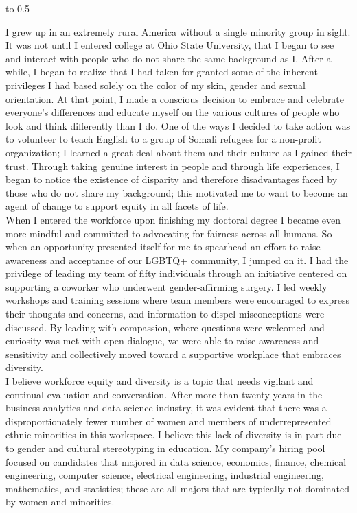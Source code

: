 

\noindent\hbox to 0.5\textwidth{}

I grew up in an extremely rural America without a single minority group in sight.  It was not until I entered college at Ohio State University, that I began to see and interact with people who do not share the same background as I.  After a while, I began to realize that I had taken for granted some of the inherent privileges I had based solely on the color of my skin, gender and sexual orientation.  At that point, I made a conscious decision to embrace and celebrate everyone's differences and educate myself on the various cultures of people who look and think differently than I do.  One of the ways I decided to take action was to volunteer to teach English to a group of Somali refugees for a non-profit organization; I learned a great deal about them and their culture as I gained their trust.  Through taking genuine interest in people and through life experiences, I began to notice the existence of disparity and therefore disadvantages faced by those who do not share my background; this motivated me to want to become an agent of change to support equity in all facets of life.  \\
\vspace{2ex}
When I entered the workforce upon finishing my doctoral degree I became even more mindful and committed to advocating for fairness across all humans.  So when an opportunity presented itself for me to spearhead an effort to raise awareness and acceptance of our LGBTQ+ community, I jumped on it. I had the privilege of leading my team of fifty individuals through an initiative centered on supporting a coworker who underwent gender-affirming surgery.  I led weekly workshops and training sessions where team members were encouraged to express their thoughts and concerns, and information to dispel misconceptions were discussed.  By leading with compassion, where questions were welcomed and curiosity was met with open dialogue, we were able to raise awareness and sensitivity and collectively moved toward a supportive workplace that embraces diversity. \\
\vspace{2ex}
I believe workforce equity and diversity is a topic that needs vigilant and continual evaluation and conversation.  After more than twenty years in the business analytics and data science industry, it was evident that there was a disproportionately fewer number of women and members of underrepresented ethnic minorities in this workspace.  I believe this lack of diversity is in part due to gender and cultural stereotyping in education.  My company's hiring pool focused on candidates that majored in data science, economics, finance, chemical engineering, computer science, electrical engineering, industrial engineering, mathematics, and statistics; these are all majors that are typically not dominated by women and minorities.  \\
